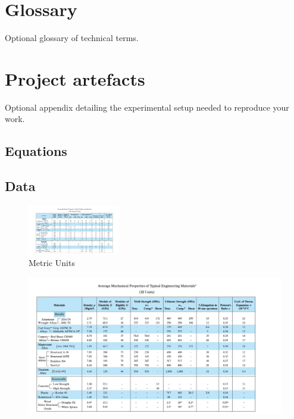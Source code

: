 
\chapter{Glossary}
Optional glossary of technical terms.

\chapter{Project artefacts}
Optional appendix detailing the experimental setup needed to reproduce your work. 
\section{Equations}

\section{Data}
\begin{figure}
\includegraphics[width=4cm]{usunits1.png}
\caption{Metric Units}
\end{figure}
\begin{figure}
    \centering
    \includegraphics{siunits1.png}
\end{figure}
